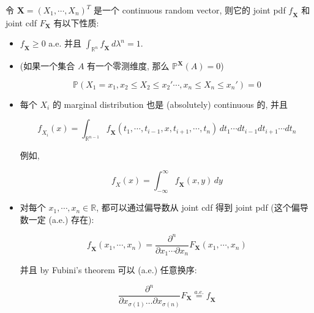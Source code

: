 \begin{proposition}{}

令 \(\mathbf{X} = (\mathit{X}_{1},\cdots,\mathit{X}_{\mathit{n}})^{\mathit{T}}\) 是一个 continuous random vector, 则它的 joint pdf \(\mathit{f}_{\mathbf{X}}\) 和 joint cdf \(\mathit{F}_{\mathbf{X}}\) 有以下性质:

\begin{itemize}
\item
  \(\mathit{f}_{\mathbf{X}} \geq 0\) a.e. 并且 \(\int_{\mathbb{R}^{\mathit{n}}}\mathit{f}_{\mathbf{X}}\,\mathit{d}\mathit{\lambda}^{\mathit{n}} = 1\).
\item
  (如果一个集合 \(\mathit{A}\) 有一个零测维度, 那么 \(\mathbb{P}^{\mathbf{X}}(\mathit{A}) = 0\))

  \[\mathbb{P}(\mathit{X}_{1} = \mathit{x}_{1},\mathit{x}_{2} \leq \mathit{X}_{2} \leq \mathit{x}_{2}'\cdots,\mathit{x}_{\mathit{n}} \leq \mathit{X}_{\mathit{n}} \leq \mathit{x}_{\mathit{n}}') = 0\]
\item
  每个 \(\mathit{X}_{\mathit{i}}\) 的 marginal distribution 也是 (absolutely) continuous 的, 并且

  \[\mathit{f}_{\mathit{X}_{\mathit{i}}}(\mathit{x}) = \int_{\mathbb{R}^{\mathit{n} - 1}}\mathit{f}_{\mathbf{X}}(\mathit{t}_{1},\cdots,\mathit{t}_{\mathit{i} - 1},\mathit{x},\mathit{t}_{\mathit{i} + 1},\cdots,\mathit{t}_{\mathit{n}})\,\mathit{d}\mathit{t}_{1}\cdots\mathit{d}\mathit{t}_{\mathit{i} - 1}\mathit{d}\mathit{t}_{\mathit{i} + 1}\cdots\mathit{d}\mathit{t}_{\mathit{n}}\]

  例如,

  \[\mathit{f}_{\mathit{X}}(\mathit{x}) = \int_{- \infty}^{\infty}\mathit{f}_{\mathbf{X}}(\mathit{x},\mathit{y})\,\mathit{d}\mathit{y}\]
\item
  对每个 \(\mathit{x}_{1},\cdots,\mathit{x}_{\mathit{n}} \in \mathbb{R}\), 都可以通过偏导数从 joint cdf 得到 joint pdf (这个偏导数一定 (a.e.) 存在):

  \[\mathit{f}_{\mathbf{X}}(\mathit{x}_{1},\cdots,\mathit{x}_{\mathit{n}}) = \frac{\mathit{\partial}^{\mathit{n}}}{\mathit{\partial}\mathit{x}_{1}\cdots\mathit{\partial}\mathit{x}_{\mathit{n}}}\mathit{F}_{\mathbf{X}}(\mathit{x}_{1},\cdots,\mathit{x}_{\mathit{n}})\]

  并且 by Fubini's theorem 可以 (a.e.) 任意换序:

  \[\frac{\mathit{\partial}^{\mathit{n}}}{\mathit{\partial}\mathit{x}_{\mathit{\sigma}(1)}\ldots\mathit{\partial}\mathit{x}_{\mathit{\sigma}(\mathit{n})}}\mathit{F}_{\mathbf{X}}\overset{\mathit{a}.\mathit{e}.}{=}\mathit{f}_{\mathbf{X}}\]
\end{itemize}

\end{proposition}

